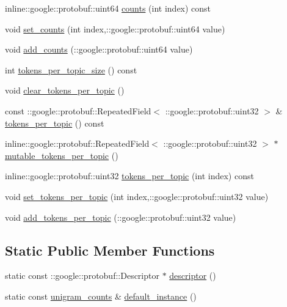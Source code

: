 \begin{DoxyCompactItemize}
\item 
inline::google::protobuf::uint64 \hyperlink{class_l_d_a_1_1unigram__counts_ae502d1a9da49765fa7a489335dce63f4}{counts} (int index) const 
\item 
void \hyperlink{class_l_d_a_1_1unigram__counts_afd1126030928dc9e7c4321d1587e0a1b}{set\_\-counts} (int index,::google::protobuf::uint64 value)
\item 
void \hyperlink{class_l_d_a_1_1unigram__counts_a99fc603e2681c467c849fba472a70f35}{add\_\-counts} (::google::protobuf::uint64 value)
\item 
int \hyperlink{class_l_d_a_1_1unigram__counts_ae60abc8497c9e86abd62d51426c1f1a0}{tokens\_\-per\_\-topic\_\-size} () const 
\item 
void \hyperlink{class_l_d_a_1_1unigram__counts_a94210b009cba49a77232f8a34a253d1b}{clear\_\-tokens\_\-per\_\-topic} ()
\item 
const ::google::protobuf::RepeatedField$<$ ::google::protobuf::uint32 $>$ \& \hyperlink{class_l_d_a_1_1unigram__counts_abe6999ecd4134cf9e6658ff5f4e3780a}{tokens\_\-per\_\-topic} () const 
\item 
inline::google::protobuf::RepeatedField$<$ ::google::protobuf::uint32 $>$ $\ast$ \hyperlink{class_l_d_a_1_1unigram__counts_ab3888e03fa6596938fafec1d00131715}{mutable\_\-tokens\_\-per\_\-topic} ()
\item 
inline::google::protobuf::uint32 \hyperlink{class_l_d_a_1_1unigram__counts_a714bd5454edd4f29dba6d01b14ca55e7}{tokens\_\-per\_\-topic} (int index) const 
\item 
void \hyperlink{class_l_d_a_1_1unigram__counts_a7de5819de5f7c49f3cf6ac62088f7cec}{set\_\-tokens\_\-per\_\-topic} (int index,::google::protobuf::uint32 value)
\item 
void \hyperlink{class_l_d_a_1_1unigram__counts_a69790173932d812cdacb953d61f1ca32}{add\_\-tokens\_\-per\_\-topic} (::google::protobuf::uint32 value)
\end{DoxyCompactItemize}
\subsection*{Static Public Member Functions}
\begin{DoxyCompactItemize}
\item 
static const ::google::protobuf::Descriptor $\ast$ \hyperlink{class_l_d_a_1_1unigram__counts_acd11528579246e228e81063c7ccf415d}{descriptor} ()
\item 
static const \hyperlink{class_l_d_a_1_1unigram__counts}{unigram\_\-counts} \& \hyperlink{class_l_d_a_1_1unigram__counts_ad503376383ee518e9782215334391e9c}{default\_\-instance} ()
\end{DoxyCompactItemize}
